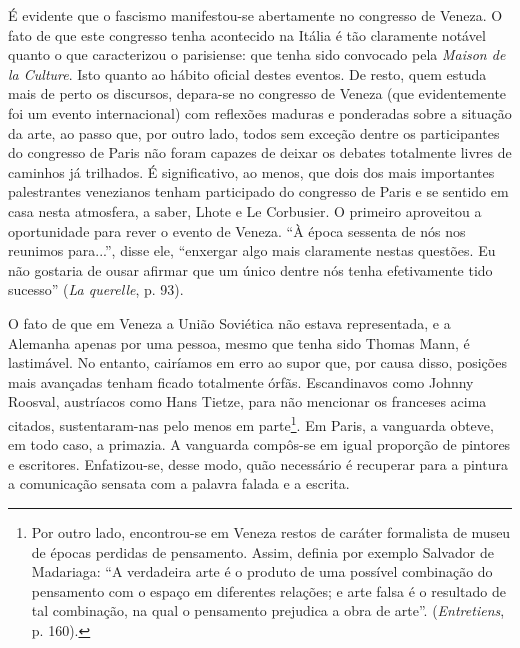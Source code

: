 É evidente que o fascismo manifestou-se abertamente no congresso de
Veneza. O fato de que este congresso tenha acontecido na Itália é tão
claramente notável quanto o que caracterizou o parisiense: que tenha
sido convocado pela \emph{Maison de la Culture}. Isto quanto ao hábito
oficial destes eventos. De resto, quem estuda mais de perto os
discursos, depara-se no congresso de Veneza (que evidentemente foi um
evento internacional) com reflexões maduras e ponderadas sobre a
situação da arte, ao passo que, por outro lado, todos sem exceção dentre
os participantes do congresso de Paris não foram capazes de deixar os
debates totalmente livres de caminhos já trilhados. É significativo, ao
menos, que dois dos mais importantes palestrantes venezianos tenham
participado do congresso de Paris e se sentido em casa nesta atmosfera,
a saber, Lhote e Le Corbusier. O primeiro aproveitou a oportunidade para
rever o evento de Veneza. ``À época sessenta de nós nos reunimos
para...'', disse ele, ``enxergar algo mais claramente nestas questões.
Eu não gostaria de ousar afirmar que um único dentre nós tenha
efetivamente tido sucesso'' (\emph{La querelle}, p. 93).

O fato de que em Veneza a União Soviética não estava representada, e a
Alemanha apenas por uma pessoa, mesmo que tenha sido Thomas Mann, é
lastimável. No entanto, cairíamos em erro ao supor que, por causa disso,
posições mais avançadas tenham ficado totalmente órfãs. Escandinavos
como Johnny Roosval, austríacos como Hans Tietze, para não mencionar os
franceses acima citados, sustentaram-nas pelo menos em parte\footnote{Por
  outro lado, encontrou-se em Veneza restos de caráter formalista de
  museu de épocas perdidas de pensamento. Assim, definia por exemplo
  Salvador de Madariaga: ``A verdadeira arte é o produto de uma possível
  combinação do pensamento com o espaço em diferentes relações; e arte
  falsa é o resultado de tal combinação, na qual o pensamento prejudica
  a obra de arte''. (\emph{Entretiens}, p. 160).}. Em Paris, a vanguarda
obteve, em todo caso, a primazia. A vanguarda compôs-se em igual
proporção de pintores e escritores. Enfatizou-se, desse modo, quão
necessário é recuperar para a pintura a comunicação sensata com a
palavra falada e a escrita.


